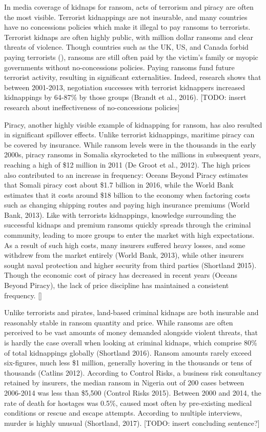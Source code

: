 \documentclass[12pt]{article}
\begin{document}
In media coverage of kidnaps for ransom, acts of terrorism and piracy are often the most visible. Terrorist kidnappings are not insurable, and many countries have no concessions policies which make it illegal to pay ransoms to terrorists. Terrorist kidnaps are often highly public, with million dollar ransoms and clear threats of violence. Though countries such as the UK, US, and Canada forbid paying terrorists (), ransoms are still often paid by the victim's family or myopic governments without no-concessions policies. Paying ransoms fund future terrorist activity, resulting in significant externalities. Indeed, research shows that between 2001-2013, negotiation successes with terrorist kidnappers increased kidnappings by 64-87\% by those groups (Brandt et al., 2016). [TODO: insert research about ineffectiveness of no-concessions policies] 

Piracy, another highly visible example of kidnapping for ransom, has also resulted in significant spillover effects. Unlike terrorist kidnappings, maritime piracy can be covered by insurance. While ransom levels were in the thousands in the early 2000s, piracy ransoms in Somalia skyrocketed to the millions in subsequent years, reaching a high of \$12 million in 2011 (De Groot et al., 2012). The high prices also contributed to an increase in frequency: Oceans Beyond Piracy estimates that Somali piracy cost about \$1.7 billion in 2016, while the World Bank estimates that it costs around \$18 billion to the economy when factoring costs such as changing shipping routes and paying high insurance premiums (World Bank, 2013). Like with terrorists kidnappings, knowledge surrounding the successful kidnaps and premium ransoms quickly spreads through the criminal community, leading to more groups to enter the market with high expectations. As a result of such high costs, many insurers suffered heavy losses, and some withdrew from the market entirely (World Bank, 2013), while other insurers sought naval protection and higher security from third parties (Shortland 2015). Though the economic cost of piracy has decreased in recent years (Oceans Beyond Piracy), the lack of price discipline has maintained a consistent frequency. []

Unlike terrorists and pirates, land-based criminal kidnaps are both insurable and reasonably stable in ransom quantity and price. While ransoms are often perceived to be vast amounts of money demanded alongside violent threats, that is hardly the case overall when looking at criminal kidnaps, which comprise 80\% of total kidnappings globally (Shortland 2016). Ransom amounts rarely exceed six-figures, much less \$1 million, generally hovering in the thousands or tens of thousands (Catlins 2012). According to Control Risks, a business risk consultancy retained by insurers, the median ransom in Nigeria out of 200 cases between 2006-2014 was less than \$5,500 (Control Risks 2015). Between 2000 and 2014, the rate of death for hostages was 0.5\%, caused most often by pre-existing medical conditions or rescue and escape attempts. According to multiple interviews, murder is highly unusual (Shortland, 2017). [TODO: insert concluding sentence?]
\end{document}
